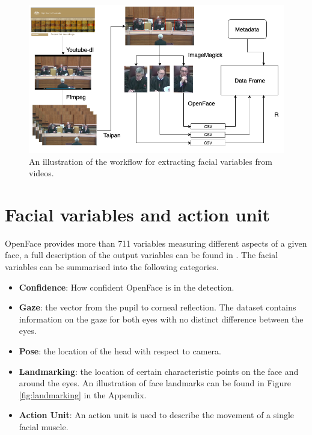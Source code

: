 \documentclass{monashthesis}
\begin{document}
\begin{figure}

{\centering \includegraphics[width=1\linewidth]{figures/workflow} 

}

\caption{An illustration of the workflow for extracting facial variables from videos. \label{fig:workflow}}\label{fig:unnamed-chunk-1}
\end{figure}

\hypertarget{facial-variables-and-action-unit}{%
\section{Facial variables and action unit}\label{facial-variables-and-action-unit}}

OpenFace provides more than 711 variables measuring different aspects of a given face, a full description of the output variables can be found in \textcite{baltrusaitis2018openface}. The facial variables can be summarised into the following categories.

\begin{itemize}
\tightlist
\item
  \textbf{Confidence}: How confident OpenFace is in the detection.
\item
  \textbf{Gaze}: the vector from the pupil to corneal reflection. The dataset contains information on the gaze for both eyes with no distinct difference between the eyes.
\item
  \textbf{Pose}: the location of the head with respect to camera.
\item
  \textbf{Landmarking}: the location of certain characteristic points on the face and around the eyes. An illustration of face landmarks can be found in Figure \ref{fig:landmarking} in the Appendix.
\item
  \textbf{Action Unit}: An action unit is used to describe the movement of a single facial muscle.
\end{itemize}
\end{document}
